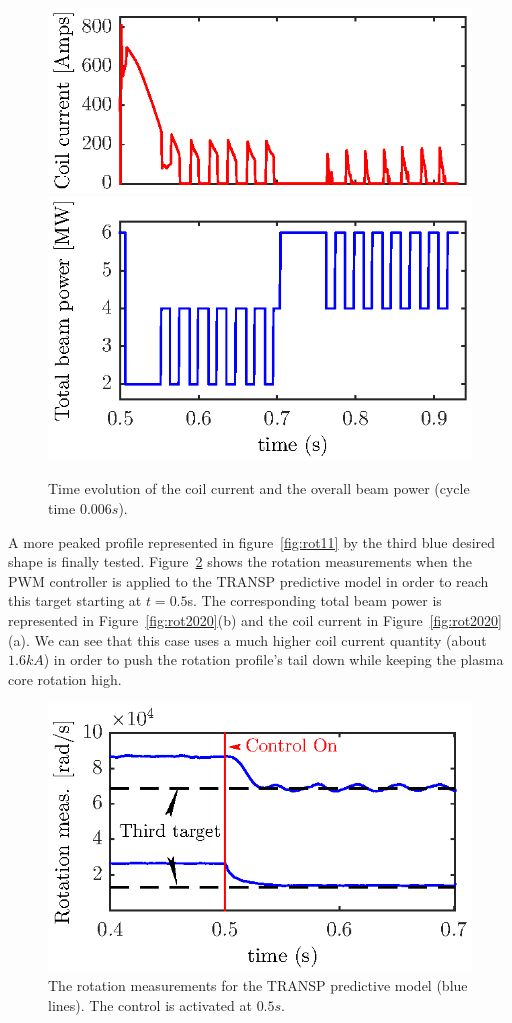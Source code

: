 \documentclass[12pt,lot, lof]{puthesis}
\begin{document}
\begin{figure}
	\centering
	\includegraphics[width=0.8 \linewidth]{fig19a}  \\[-0.5em]
	\includegraphics[width=0.8 \linewidth]{fig19b} 
	\caption{Time evolution of the coil current and the overall beam power (cycle time $0.006 s$). }
	\label{fig:rot17}
\end{figure}

A more peaked profile represented in figure~\ref{fig:rot11} by the third blue desired shape is finally tested.
Figure~\ref{fig:rot1919} shows the rotation measurements when the PWM controller is applied to the TRANSP predictive model in order to reach this target starting at $t = 0.5$s.
The corresponding total beam power is represented in Figure~\ref{fig:rot2020}(b) and the coil current in Figure~\ref{fig:rot2020}(a). We can see that this case uses a much higher coil current quantity (about $1.6kA$) in order to push the rotation profile's tail down while keeping the plasma core rotation high.

\begin{figure}
	\centering
	\includegraphics[width=0.8 \linewidth]{fig20}
	\caption{The rotation measurements for the TRANSP predictive model (blue lines). The control is activated at $0.5s$.}
	\label{fig:rot1919}
\end{figure}
\end{document}
